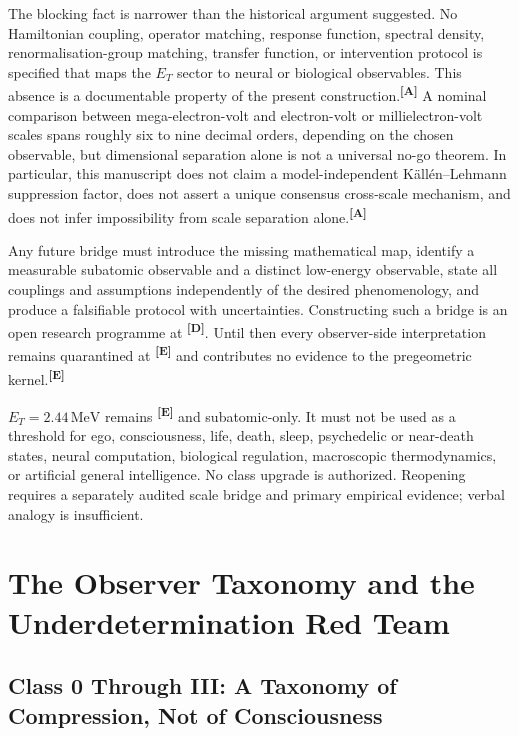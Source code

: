 \documentclass[12pt,a4paper,twoside]{article}
\theoremstyle{plain}
\theoremstyle{definition}
\theoremstyle{remark}
\newcommand{\MeV}{\,\mathrm{MeV}}
\newcommand{\catmark}[1]{\textsuperscript{\textsf{\textbf{[#1]}}}}
\newcommand{\ETorsion}{2.44\MeV} %
\begin{document}
The blocking fact is narrower than the historical argument suggested. No
Hamiltonian coupling, operator matching, response function, spectral density,
renormalisation-group matching, transfer function, or intervention protocol is
specified that maps the $E_T$ sector to neural or biological observables. This
absence is a documentable property of the present construction.\catmark{A}
A nominal comparison between mega-electron-volt and electron-volt or
millielectron-volt scales spans roughly six to nine decimal orders, depending
on the chosen observable, but dimensional separation alone is not a universal
no-go theorem. In particular, this manuscript does not claim a model-independent
K\"all\'en--Lehmann suppression factor, does not assert a unique consensus
cross-scale mechanism, and does not infer impossibility from scale separation
alone.\catmark{A}

Any future bridge must introduce the missing mathematical map, identify a
measurable subatomic observable and a distinct low-energy observable, state
all couplings and assumptions independently of the desired phenomenology, and
produce a falsifiable protocol with uncertainties. Constructing such a bridge
is an open research programme at \catmark{D}. Until then every observer-side
interpretation remains quarantined at \catmark{E} and contributes no evidence
to the pregeometric kernel.\catmark{E}

\begin{governancebox}
$E_T=\ETorsion$ remains \catmark{E} and subatomic-only. It must not be used as
a threshold for ego, consciousness, life, death, sleep, psychedelic or
near-death states, neural computation, biological regulation, macroscopic
thermodynamics, or artificial general intelligence. No class upgrade is
authorized. Reopening requires a separately audited scale bridge and primary
empirical evidence; verbal analogy is insufficient.
\end{governancebox}

\section{The Observer Taxonomy and the Underdetermination Red Team}
\label{sec:observer-taxonomy-underdetermination}

\subsection{Class 0 Through III: A Taxonomy of Compression, Not of Consciousness}
\label{subsec:observer-taxonomy}
\end{document}
